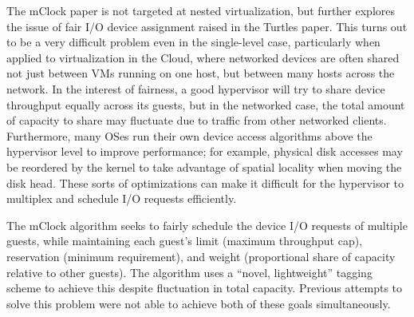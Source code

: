 \documentclass[letterpaper, twocolumn]{article}
\begin{document}
The mClock paper \cite{ref:mclock} is not targeted at nested virtualization,
but further explores
the issue of fair I/O device assignment raised in the Turtles paper.  This turns
out to be a very difficult problem even in the single-level case, particularly
when applied to virtualization in the Cloud, where networked devices are
often shared not just between VMs running on one host, but between many hosts
across the network.  In the interest of fairness, a good hypervisor will try to
share device throughput equally across its guests, but in the networked case, the
total amount of capacity to share may fluctuate due to traffic from other
networked clients.  Furthermore, many OSes run their own device access algorithms
above the hypervisor level to improve performance; for example, physical disk
accesses may be reordered by the kernel to take advantage of spatial locality
when moving the disk head.  These sorts of optimizations can make it difficult
for the hypervisor to multiplex and schedule I/O requests efficiently.

The mClock algorithm seeks to fairly schedule the device I/O requests of multiple guests,
while maintaining each guest's limit (maximum throughput cap), reservation
(minimum requirement), and weight (proportional share of capacity relative to
other guests).  The algorithm uses a ``novel, lightweight'' tagging scheme to
achieve this despite fluctuation in total capacity.  Previous attempts to solve
this problem were not able to achieve both of these goals simultaneously.
\end{document}
